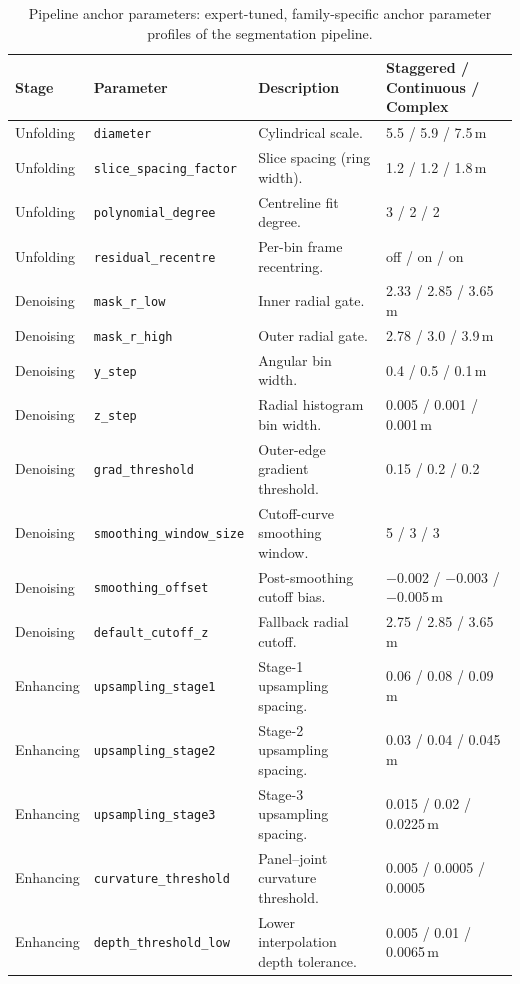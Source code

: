 \documentclass[a4paper,fleqn]{cas-dc}
\begin{document}
\begin{table}[t]
\caption{Pipeline anchor parameters: expert-tuned, family-specific anchor parameter profiles of the segmentation pipeline.}\label{tab:anchor-params}
\begin{tabular*}{\textwidth}{@{\extracolsep{\fill}} l l p{} l @{}}
\toprule
Stage & Parameter & Description & Staggered / Continuous / Complex \\
\midrule
Unfolding & \texttt{diameter} & Cylindrical scale. & 5.5 / 5.9 / 7.5\,m \\
Unfolding & \texttt{slice\_spacing\_factor} & Slice spacing (ring width). & 1.2 / 1.2 / 1.8\,m \\
Unfolding & \texttt{polynomial\_degree} & Centreline fit degree. & 3 / 2 / 2 \\
Unfolding & \texttt{residual\_recentre} & Per-bin frame recentring. & off / on / on \\
\midrule
Denoising & \texttt{mask\_r\_low} & Inner radial gate. & 2.33 / 2.85 / 3.65\,m \\
Denoising & \texttt{mask\_r\_high} & Outer radial gate. & 2.78 / 3.0 / 3.9\,m \\
Denoising & \texttt{y\_step} & Angular bin width. & 0.4 / 0.5 / 0.1\,m \\
Denoising & \texttt{z\_step} & Radial histogram bin width. & 0.005 / 0.001 / 0.001\,m \\
Denoising & \texttt{grad\_threshold} & Outer-edge gradient threshold. & 0.15 / 0.2 / 0.2 \\
Denoising & \texttt{smoothing\_window\_size} & Cutoff-curve smoothing window. & 5 / 3 / 3 \\
Denoising & \texttt{smoothing\_offset} & Post-smoothing cutoff bias. & $-$0.002 / $-$0.003 / $-$0.005\,m \\
Denoising & \texttt{default\_cutoff\_z} & Fallback radial cutoff. & 2.75 / 2.85 / 3.65\,m \\
\midrule
Enhancing & \texttt{upsampling\_stage1} & Stage-1 upsampling spacing. & 0.06 / 0.08 / 0.09\,m \\
Enhancing & \texttt{upsampling\_stage2} & Stage-2 upsampling spacing. & 0.03 / 0.04 / 0.045\,m \\
Enhancing & \texttt{upsampling\_stage3} & Stage-3 upsampling spacing. & 0.015 / 0.02 / 0.0225\,m \\
Enhancing & \texttt{curvature\_threshold} & Panel--joint curvature threshold. & 0.005 / 0.0005 / 0.0005 \\
Enhancing & \texttt{depth\_threshold\_low} & Lower interpolation depth tolerance. & 0.005 / 0.01 / 0.0065\,m \\

\end{tabular*}
\end{table}
\end{document}
